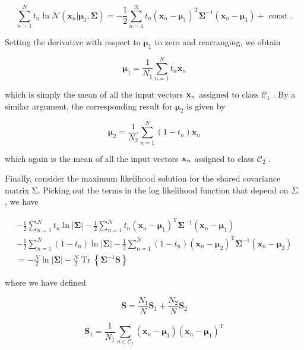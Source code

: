 \documentclass[
  10
]{article}
\begin{document}
\[
\sum_ {n = 1} ^ {N} t _ {n} \ln \mathcal {N} (\mathbf {x} _ {n} | \boldsymbol {\mu} _ {1}, \boldsymbol {\Sigma}) = - \frac {1}{2} \sum_ {n = 1} ^ {N} t _ {n} (\mathbf {x} _ {n} - \boldsymbol {\mu} _ {1}) ^ {\mathrm{T}} \boldsymbol {\Sigma} ^ {- 1} (\mathbf {x} _ {n} - \boldsymbol {\mu} _ {1}) + \text { const }.\tag{4.74}
\]

Setting the derivative with respect to \(\pmb { \mu } _ { 1 }\) to zero
and rearranging, we obtain

\[
\pmb {\mu} _ {1} = \frac {1}{N _ {1}} \sum_ {n = 1} ^ {N} t _ {n} \mathbf {x} _ {n}\tag{4.75}
\]

which is simply the mean of all the input vectors \({ \bf x } _ { n }\)
assigned to class \(\mathcal { C } _ { 1 }\) . By a similar argument,
the corresponding result for \(\pmb { \mu } _ { 2 }\) is given by

\[
\boldsymbol {\mu} _ {2} = \frac {1}{N _ {2}} \sum_ {n = 1} ^ {N} (1 - t _ {n}) \mathbf {x} _ {n}\tag{4.76}
\]

which again is the mean of all the input vectors \({ \bf x } _ { n }\)
assigned to class \(\mathcal { C } _ { 2 }\) .

Finally, consider the maximum likelihood solution for the shared
covariance matrix Σ. Picking out the terms in the log likelihood
function that depend on \(\Sigma .\) , we have

\[
\begin{array}{l} - \frac {1}{2} \sum_ {n = 1} ^ {N} t _ {n} \ln | \boldsymbol {\Sigma} | - \frac {1}{2} \sum_ {n = 1} ^ {N} t _ {n} (\mathbf {x} _ {n} - \boldsymbol {\mu} _ {1}) ^ {\mathrm{T}} \boldsymbol {\Sigma} ^ {- 1} (\mathbf {x} _ {n} - \boldsymbol {\mu} _ {1}) \\ - \frac {1}{2} \sum_ {n = 1} ^ {N} (1 - t _ {n}) \ln | \boldsymbol {\Sigma} | - \frac {1}{2} \sum_ {n = 1} ^ {N} (1 - t _ {n}) (\mathbf {x} _ {n} - \boldsymbol {\mu} _ {2}) ^ {\mathrm{T}} \boldsymbol {\Sigma} ^ {- 1} (\mathbf {x} _ {n} - \boldsymbol {\mu} _ {2}) \\ = - \frac {N}{2} \ln | \boldsymbol {\Sigma} | - \frac {N}{2} \operatorname{Tr} \left\{\boldsymbol {\Sigma} ^ {- 1} \mathbf {S} \right\} \end{array}\tag{4.77}
\]

where we have defined

\[
\mathbf {S} = \frac {N _ {1}}{N} \mathbf {S} _ {1} + \frac {N _ {2}}{N} \mathbf {S} _ {2}\tag{4.78}
\]

\[
{\mathbf S} _ {1} = \frac {1}{N _ {1}} \sum_ {n \in \mathcal {C} _ {1}} ({\mathbf x} _ {n} - {\boldsymbol {\mu}} _ {1}) ({\mathbf x} _ {n} - {\boldsymbol {\mu}} _ {1}) ^ {\mathrm{T}}\tag{4.79}
\]
\end{document}
